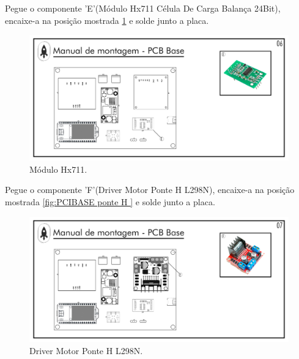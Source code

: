 \par Pegue o componente 'E'(Módulo Hx711 Célula De Carga Balança 24Bit), encaixe-a na posição mostrada \ref{fig:PCIBASE Módulo Hx711  } e solde junto a placa.
\begin{figure}[H]
  \centering
  \includegraphics[width=\textwidth]{Figuras/BASE/Pg-06---PL-03.png}
  \caption{Módulo Hx711.}
  \label{fig:PCIBASE Módulo Hx711  }
\end{figure}



\newpage

\par Pegue o componente 'F'(Driver Motor Ponte H L298N), encaixe-a na posição mostrada \ref{fig:PCIBASE ponte H   } e solde junto a placa.
\begin{figure}[H]
  \centering
  \includegraphics[width=\textwidth]{Figuras/BASE/Pg-07---PL-03.png}
  \caption{Driver Motor Ponte H L298N.}
  \label{fig:PCIBASE ponte H  }
\end{figure}

